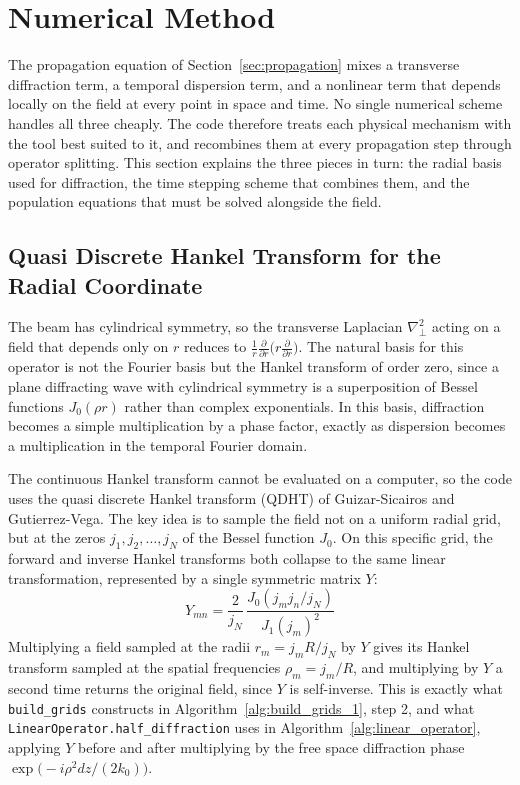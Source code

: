 \section{Numerical Method}
\label{sec:numerical}

The propagation equation of Section~\ref{sec:propagation} mixes a transverse diffraction term, a temporal dispersion term, and a nonlinear term that depends locally on the field at every point in space and time. No single numerical scheme handles all three cheaply. The code therefore treats each physical mechanism with the tool best suited to it, and recombines them at every propagation step through operator splitting. This section explains the three pieces in turn: the radial basis used for diffraction, the time stepping scheme that combines them, and the population equations that must be solved alongside the field.

\subsection{Quasi Discrete Hankel Transform for the Radial Coordinate}

The beam has cylindrical symmetry, so the transverse Laplacian $\nabla_\perp^2$ acting on a field that depends only on $r$ reduces to $\frac{1}{r}\frac{\partial}{\partial r}\big(r\frac{\partial}{\partial r}\big)$. The natural basis for this operator is not the Fourier basis but the Hankel transform of order zero, since a plane diffracting wave with cylindrical symmetry is a superposition of Bessel functions $J_0(\rho r)$ rather than complex exponentials. In this basis, diffraction becomes a simple multiplication by a phase factor, exactly as dispersion becomes a multiplication in the temporal Fourier domain.

The continuous Hankel transform cannot be evaluated on a computer, so the code uses the quasi discrete Hankel transform (QDHT) of Guizar-Sicairos and Gutierrez-Vega. The key idea is to sample the field not on a uniform radial grid, but at the zeros $j_1, j_2, \dots, j_N$ of the Bessel function $J_0$. On this specific grid, the forward and inverse Hankel transforms both collapse to the same linear transformation, represented by a single symmetric matrix $Y$:
\begin{equation}
Y_{mn} = \frac{2}{j_N}\,\frac{J_0(j_mj_n/j_N)}{J_1(j_m)^2}
\end{equation}
Multiplying a field sampled at the radii $r_m = j_m R/j_N$ by $Y$ gives its Hankel transform sampled at the spatial frequencies $\rho_m = j_m/R$, and multiplying by $Y$ a second time returns the original field, since $Y$ is self-inverse. This is exactly what \texttt{build\_grids} constructs in Algorithm~\ref{alg:build_grids_1}, step 2, and what \texttt{LinearOperator.half\_diffraction} uses in Algorithm~\ref{alg:linear_operator}, applying $Y$ before and after multiplying by the free space diffraction phase $\exp\!\big(-i\rho^2 dz/(2k_0)\big)$.

